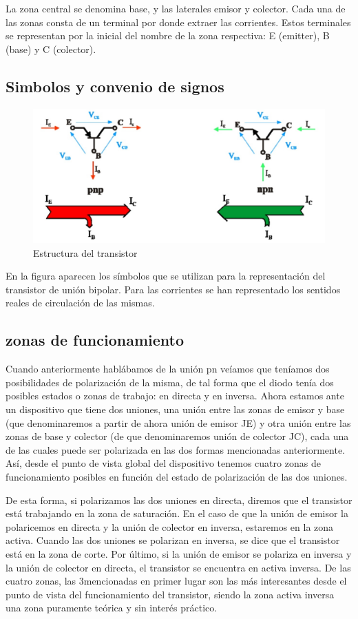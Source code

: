 \documentclass[10pt, a4paper]{article}
\begin{document}
    La zona central se denomina base, y las laterales emisor y colector. Cada una de las zonas consta de un terminal por donde extraer las corrientes. Estos terminales se representan por la inicial del nombre de la zona respectiva: E (emitter), B (base) y C (colector).

    \subsection{Simbolos y convenio de signos}

    \begin{figure}[h!]
        \centering
        \includegraphics[height=4cm\textwidth]{simbolos.jpg}
        \caption{\label{fig:2} Estructura del transistor }
    \end{figure}

    En la figura aparecen los símbolos que se utilizan para la representación del transistor de unión bipolar. Para las corrientes se han representado los sentidos reales de circulación de las mismas.

    \subsection{zonas de funcionamiento}

    Cuando anteriormente hablábamos de la unión pn veíamos que teníamos dos posibilidades de polarización de la misma, de tal forma que el diodo tenía dos posibles estados o zonas de trabajo: en directa y en inversa. Ahora estamos ante un dispositivo que tiene dos uniones, una unión entre las zonas de emisor y base (que denominaremos a partir de ahora unión de emisor JE) y otra unión entre las zonas de base y colector (de que denominaremos unión de colector JC), cada una de las cuales puede ser polarizada en las dos formas mencionadas anteriormente. Así, desde el punto de vista global del dispositivo tenemos cuatro zonas de funcionamiento posibles en función del estado de polarización de las dos uniones.

    De esta forma, si polarizamos las dos uniones en directa, diremos que el transistor está trabajando en la zona de saturación. En el caso de que la unión de emisor la polaricemos en directa y la unión de colector en inversa, estaremos en la zona activa. Cuando las dos uniones se polarizan en inversa, se dice que el transistor está en la zona de corte. Por último, si la unión de emisor se polariza en inversa y la unión de colector en directa, el transistor se encuentra en activa inversa. De las cuatro zonas, las 3mencionadas en primer lugar son las más interesantes desde el punto de vista del funcionamiento del transistor, siendo la zona activa inversa una zona puramente teórica y sin interés práctico.
\end{document}

